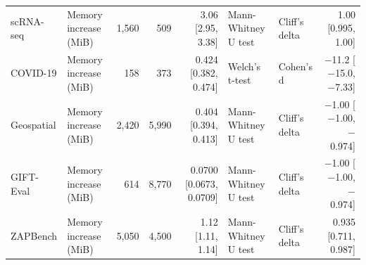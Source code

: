 \begin{table}[ht]
\begin{tabular}{llrrrllr}
  scRNA-seq & Memory increase (MiB) & 1,560 & 509 & 3.06 [2.95, 3.38] & Mann-Whitney U test & Cliff's delta & 1.00 [0.995, 1.00] \\ 
  COVID-19 & Memory increase (MiB) & 158 & 373 & 0.424 [0.382, 0.474] & Welch's t-test & Cohen's d & $-$11.2 [$-$15.0, $-$7.33] \\ 
  Geospatial & Memory increase (MiB) & 2,420 & 5,990 & 0.404 [0.394, 0.413] & Mann-Whitney U test & Cliff's delta & $-$1.00 [$-$1.00, $-$0.974] \\ 
  GIFT-Eval & Memory increase (MiB) & 614 & 8,770 & 0.0700 [0.0673, 0.0709] & Mann-Whitney U test & Cliff's delta & $-$1.00 [$-$1.00, $-$0.974] \\ 
  ZAPBench & Memory increase (MiB) & 5,050 & 4,500 & 1.12 [1.11, 1.14] & Mann-Whitney U test & Cliff's delta & 0.935 [0.711, 0.987] \\ 
   \bottomrule
\end{tabular}
\endgroup
\end{table}
